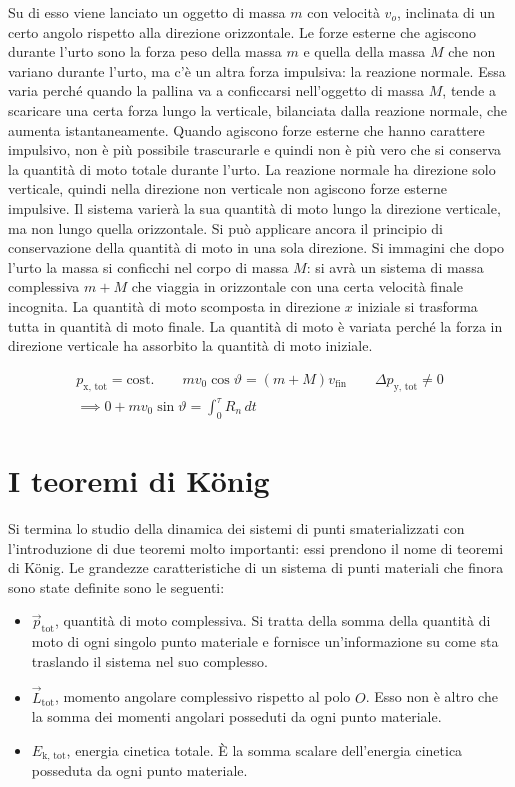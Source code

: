 \FloatBarrier
Su di esso viene lanciato un oggetto di massa $m$ con velocità $v_o$, inclinata di un certo angolo rispetto alla direzione orizzontale. Le forze esterne che agiscono durante l'urto sono la forza peso della massa $m$ e quella della massa $M$ che non variano durante l'urto, ma c'è un altra forza impulsiva: la reazione normale. Essa varia perché quando la pallina va a conficcarsi nell'oggetto di massa $M$,  tende a scaricare una certa forza lungo la verticale, bilanciata dalla reazione normale, che aumenta istantaneamente. Quando agiscono forze esterne che hanno carattere impulsivo, non è più possibile trascurarle e quindi non è più vero che si conserva la quantità di moto totale durante l'urto. La reazione normale ha direzione solo verticale, quindi nella direzione non verticale non agiscono forze esterne impulsive. Il sistema varierà la sua quantità di moto lungo la direzione verticale, ma non lungo quella orizzontale. Si può applicare ancora il principio di conservazione della quantità di moto in una sola direzione. Si immagini che dopo l'urto la massa si conficchi nel corpo di massa $M$: si avrà un sistema di massa complessiva $m+M$ che viaggia in orizzontale con una certa velocità finale incognita. La quantità di moto scomposta in direzione $x$ iniziale si trasforma tutta in quantità di moto finale. La quantità di moto è variata perché la forza in direzione verticale ha assorbito la quantità di moto iniziale.

\begin{gather*}
	p_\text{x, tot}=\text{cost.} \qquad mv_0\cos\vartheta=(m+M)v_\text{fin} \qquad \Delta p_\text{y, tot} \ne 0 \\
	\implies 0+mv_0\sin\vartheta=\int_0^\tau R_n \, dt
\end{gather*}

\section{I teoremi di K\"onig}

Si termina lo studio della dinamica dei sistemi di punti smaterializzati con l'introduzione di due teoremi molto importanti: essi prendono il nome di teoremi di K\"onig. Le grandezze caratteristiche di un sistema di punti materiali che finora sono state definite sono le seguenti:

\begin{itemize}
	\item $\vec{p}_\text{tot}$, quantità di moto complessiva. Si tratta della somma della quantità di moto di ogni singolo punto materiale e fornisce un'informazione su come sta traslando il sistema nel suo complesso.
	\item $\vec{L}_\text{tot}$, momento angolare complessivo rispetto al polo $O$. Esso non è altro che la somma dei momenti angolari posseduti da ogni punto materiale.
	\item $E_\text{k, tot}$, energia cinetica totale. È la somma scalare dell'energia cinetica posseduta da ogni punto materiale.
\end{itemize}

